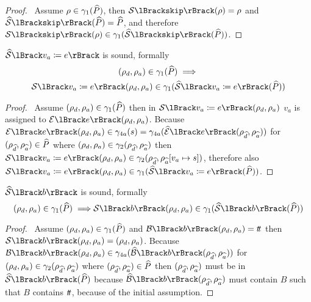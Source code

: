 \begin{proof}
    \pf\ Assume $\rho \in \gamma_1(\widehat{P})$, then $\sem{\texttt{skip}}(\rho) = \rho$ and $\abssem{\texttt{skip}}(\ab{P}) = \ab{P}$, and therefore $\sem{\texttt{skip}}(\rho) \in \concrete_1(\abssem{\texttt{skip}}(\ab{P}))$.
\end{proof}


\begin{conjecture}
    \label{thm:sound-assign}
    $\abssem{v_a \coloneqq e}$ is sound, formally
    \begin{multline*}
    (\rho_d, \rho_a)
        \in \concrete_1(\ab{P}) \implies \\
        \sem{v_a \coloneqq e}(\rho_d, \rho_a) \in \concrete_1(\abssem{v_a \coloneqq e}(\ab{P}))
    \end{multline*}
\end{conjecture}


\begin{proof}
    \pf\
    Assume $(\rho_{d}, \rho_{a}) \in \gamma_1(\widehat{P})$ then in $\sem{v_a \coloneqq e}(\env{d}, \env{a})$ $v_a$ is assigned to $\expsem{e}(\env{d}, \env{a})$.
    Because $\expsem{e}(\env{d}, \env{a}) \in \concrete_{4a}(s) = \concrete_{4a}(\absexpsem{e}(\env{\ab{d}}, \env{\ab{a}}))$ for $(\rho_{\widehat{d}}, \rho_{\widehat{a}}) \in \widehat{P}$ where $(\rho_{d}, \rho_{a}) \in \gamma_2(\rho_{\widehat{d}}, \rho_{\widehat{a}})$ then $\sem{v_a \coloneqq e}(\env{d}, \env{a}) \in \concrete_2(\env{\ab{d}}, \env{\ab{a}}[v_a \mapsto s])$, therefore also $\sem{v_a \coloneqq e}(\env{d}, \env{a})\in \concrete_1(\abssem{v_a \coloneqq e}(\ab{P}))$.
\end{proof}


\begin{conjecture}
    \label{thm:sound-boolsem}
    $\abssem{b}$ is sound, formally
    \begin{equation*}
    (\rho_d, \rho_a)
        \in \concrete_1(\ab{P}) \implies \\
        \sem{b}(\rho_d, \rho_a) \in \concrete_1(\abssem{b}(\ab{P}))
    \end{equation*}
\end{conjecture}


\begin{proof}
    \pf\
    Assume $(\rho_{d}, \rho_{a}) \in \gamma_1(\widehat{P})$ and $\boolsem{b}(\env{d}, \env{a}) = \true$ then $\sem{b}(\env{d}, \env{a}) = (\env{d}, \env{a})$.
    Because $\boolsem{b}(\env{d}, \env{a}) \in \concrete_{4a}(\absboolsem{b}(\env{\ab{d}}, \env{\ab{a}}))$ for $(\rho_{d}, \rho_{a}) \in \gamma_2(\rho_{\widehat{d}}, \rho_{\widehat{a}})$ where $(\rho_{\widehat{d}}, \rho_{\widehat{a}}) \in \widehat{P}$ then $(\rho_{\widehat{d}}, \rho_{\widehat{a}})$ must be in $\abssem{b}(\ab{P})$ because $\absboolsem{b}(\env{\ab{d}}, \env{\ab{a}})$ must contain $B$ such that $B$ contains $t\!t$, because of the initial assumption.
\end{proof}


